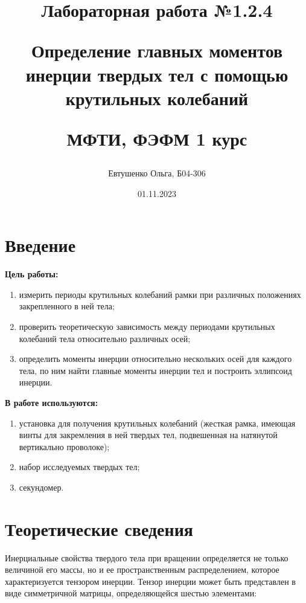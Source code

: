 \documentclass[a4paper, 12pt]{article}
\title{
    \begin{center}
        Лабораторная работа №1.2.4
    \end{center}
    \begin{center}
        Определение главных моментов инерции твердых тел с помощью крутильных колебаний
    \end{center}
    \begin{center}
        МФТИ, ФЭФМ 1 курс
    \end{center}   
}
\author{Евтушенко Ольга, Б04-306}
\date{01.11.2023}
\begin{document}
    \maketitle
    \newpage

    \section*{Введение}

    \noindent\textbf{Цель работы:} 
    \begin{enumerate}
        \item измерить периоды крутильных колебаний рамки при различных положениях закрепленного в ней тела; 
        \item проверить теоретическую зависимость между периодами крутильных колебаний тела относительно различных осей; 
        \item определить моменты инерции относительно нескольких осей для каждого тела, по ним найти главные моменты инерции тел и построить эллипсоид инерции.
    \end{enumerate}
    
    \vspace{0.35cm}
    
    \noindent\textbf{В работе используются:} 
    \begin{enumerate}
        \item установка для получения крутильных колебаний (жесткая рамка, имеющая винты для закремления в ней твердых тел, подвешенная на натянутой вертикально проволоке);
        \item набор исследуемых твердых тел;
        \item секундомер.
    \end{enumerate}

    \newpage
    
    \section*{Теоретические сведения}
        Инерциальные свойства твердого тела при вращении определяется не только величиной его массы, но и ее пространственным распределением, которое характеризуется тензором инерции. Тензор инерции может быть представлен в виде симметричной матрицы, определяющейся шестью элементами:
            
\end{document}
